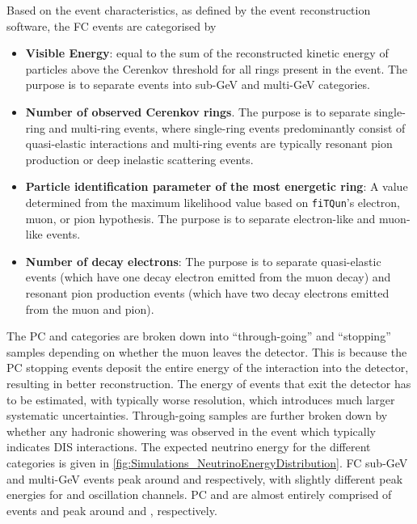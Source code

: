 Based on the event characteristics, as defined by the \fq event reconstruction software, the FC events are categorised by

\begin{itemize}
    \item \textbf{Visible Energy}: equal to the sum of the reconstructed kinetic energy of particles above the Cerenkov threshold for all rings present in the event. The purpose is to separate events into sub-GeV and multi-GeV categories. 
    \item \textbf{Number of observed Cerenkov rings}. The purpose is to separate single-ring and multi-ring events, where single-ring events predominantly consist of quasi-elastic interactions and multi-ring events are typically resonant pion production or deep inelastic scattering events.
    \item \textbf{Particle identification parameter of the most energetic ring}: A value determined from the maximum likelihood value based on \texttt{fiTQun}'s electron, muon, or pion hypothesis. The purpose is to separate electron-like and muon-like events.
    \item \textbf{Number of decay electrons}: The purpose is to separate quasi-elastic events (which have one decay electron emitted from the muon decay) and resonant pion production events (which have two decay electrons emitted from the muon and pion).
\end{itemize}

The PC and  categories are broken down into ``through-going'' and ``stopping'' samples depending on whether the muon leaves the detector. This is because the PC stopping events deposit the entire energy of the interaction into the detector, resulting in better reconstruction. The energy of events that exit the detector has to be estimated, with typically worse resolution, which introduces much larger systematic uncertainties. Through-going  samples are further broken down by whether any hadronic showering was observed in the event which typically indicates DIS interactions. The expected neutrino energy for the different categories is given in \autoref{fig:Simulations_NeutrinoEnergyDistribution}. FC sub-GeV and multi-GeV events peak around  and  respectively, with slightly different peak energies for  and \quickmath{\nu_{\mu}} oscillation channels. PC and  are almost entirely comprised of \quickmath{\nu_{\mu}} events and peak around  and , respectively.


